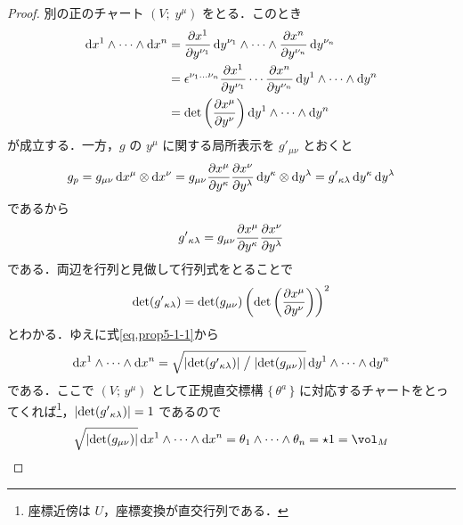 \documentclass[geometry_main]{subfiles}
\begin{document}
\begin{proof} 
	別の正のチャート $(V;\; y^\mu)$ をとる．このとき
	\begin{align} 
		\dd{x^{1}} \wedge \cdots \wedge \dd{x^{n}} &= \pdv{x^1}{y^{\nu_1}}\dd{y^{\nu_1}} \wedge \cdots \wedge \pdv{x^n}{y^{\nu_n}}\dd{y^{\nu_n}} \\
		&= \epsilon^{\nu_1 \dots \nu_n} \pdv{x^1}{y^{\nu_1}} \cdots \pdv{x^n}{y^{\nu_n}} \dd{y^1} \wedge \cdots \wedge \dd{y^n} \\
		&= \det \left( \pdv{x^\mu}{y^{\nu}} \right) \dd{y^1} \wedge \cdots \wedge \dd{y^n} \label{eq.prop5-1-1}
	\end{align}
	が成立する．一方，$g$ の $y^\mu$ に関する局所表示を $g'{}_{\mu \nu}$ とおくと 
	\begin{align} 
		g_p = g_{ \mu\nu} \dd{x^\mu} \otimes \dd{x^\nu} = g_{\mu\nu} \pdv{x^\mu}{y^\kappa} \pdv{x^\nu}{y^\lambda} \dd{y^\kappa} \otimes \dd{y^\lambda} = g'{}_{\kappa\lambda} \dd{y^\kappa} \dd{y^\lambda}
	\end{align}
	であるから
	\begin{align} 
		g'{}_{\kappa\lambda} = g_{\mu\nu} \pdv{x^\mu}{y^\kappa} \pdv{x^\nu}{y^\lambda} 
	\end{align}
	である．両辺を行列と見做して行列式をとることで
	\begin{align} 
		\det (g'{}_{\kappa\lambda}) = \det (g_{\mu\nu}) \left(\det \left( \pdv{x^\mu}{y^{\nu}} \right) \right)^2
	\end{align}
	とわかる．ゆえに式\eqref{eq.prop5-1-1}から
	\begin{align} 
		\dd{x^{1}} \wedge \cdots \wedge \dd{x^{n}} = \sqrt{\abs{\det (g'{}_{\kappa\lambda})} \bigm/ \abs{\det (g_{\mu\nu})}} \dd{y^1} \wedge \cdots \wedge \dd{y^n}
	\end{align}
	である．ここで $(V;\, y^\mu)$ として正規直交標構 $\{\, \theta^a\, \}$ に対応するチャートをとってくれば\footnote{座標近傍は $U$，座標変換が直交行列である．}，$\abs{\det (g'{}_{\kappa\lambda})} = 1$ であるので
	\begin{align} 
		\sqrt{\abs{\det (g_{\mu\nu})}} \dd{x^{1}} \wedge \cdots \wedge \dd{x^{n}} = \theta_1 \wedge \cdots \wedge \theta_n = \star 1 = \vol_M
	\end{align}
\end{proof}
\end{document}
